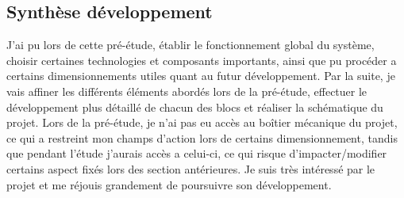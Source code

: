 \subsection{Synthèse développement} \label{ssec:PreeConc}
{

J'ai pu lors de cette pré-étude, établir le fonctionnement global du système, choisir certaines technologies et composants importants, ainsi que pu procéder a certains dimensionnements utiles quant au futur développement. 
Par la suite, je vais affiner les différents éléments abordés lors de la pré-étude, effectuer le développement plus détaillé de chacun des blocs et réaliser la schématique du projet.
Lors de la pré-étude, je n'ai pas eu accès au boîtier mécanique du projet, ce qui a restreint mon champs d'action lors de certains dimensionnement, tandis que pendant l'étude j'aurais accès a celui-ci, ce qui risque d'impacter/modifier certains aspect fixés lors des section antérieures.
Je suis très intéressé par le projet et me réjouis grandement de poursuivre son développement.

}

\clearpage
